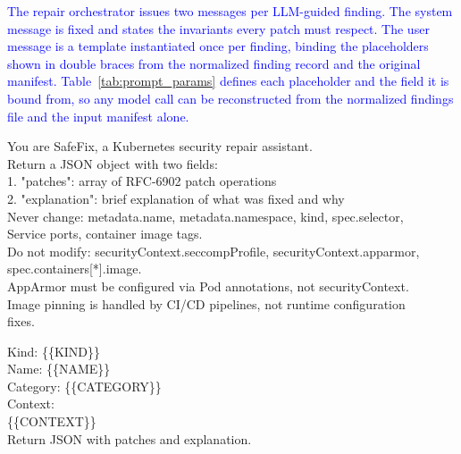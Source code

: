 \documentclass[preprint,12pt]{elsarticle}
\newcommand{\new}[1]{\textcolor{blue}{#1}}
\begin{document}
\new{The repair orchestrator issues two messages per LLM-guided finding. The
system message is fixed and states the invariants every patch must respect.
The user message is a template instantiated once per finding, binding the
placeholders shown in double braces from the normalized finding record and
the original manifest. Table~\ref{tab:prompt_params} defines each placeholder
and the field it is bound from, so any model call can be reconstructed from
the normalized findings file and the input manifest alone.}

\begin{tcolorbox}[
    colback=gray!5!white,
    colframe=gray!75!black,
    title=System message,
    fonttitle=\bfseries,
    breakable
]
\small\ttfamily
You are SafeFix, a Kubernetes security repair assistant.\\
Return a JSON object with two fields:\\
\hspace*{1em}1. "patches": array of RFC-6902 patch operations\\
\hspace*{1em}2. "explanation": brief explanation of what was fixed and why\\[6pt]
Never change: metadata.name, metadata.namespace, kind, spec.selector,\\
Service ports, container image tags.\\
Do not modify: securityContext.seccompProfile, securityContext.apparmor,\\
spec.containers[*].image.\\
AppArmor must be configured via Pod annotations, not securityContext.\\
Image pinning is handled by CI/CD pipelines, not runtime configuration\\
fixes.
\end{tcolorbox}

\begin{tcolorbox}[
    colback=gray!5!white,
    colframe=gray!75!black,
    title=User message template (instantiated per finding),
    fonttitle=\bfseries,
    breakable
]
\small\ttfamily
Kind: \{\{KIND\}\}\\
Name: \{\{NAME\}\}\\
Category: \{\{CATEGORY\}\}\\[6pt]
Context:\\
\{\{CONTEXT\}\}\\[6pt]
Return JSON with patches and explanation.
\end{tcolorbox}
\end{document}
